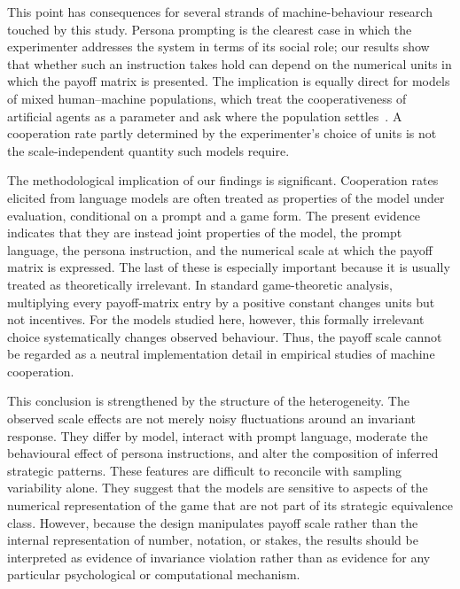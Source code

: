 \documentclass[11pt,a4paper]{article}
\begin{document}
This point has consequences for several strands of machine-behaviour research touched by this study. Persona prompting is the clearest case in which the experimenter addresses the system in terms of its social role; our results show that whether such an instruction takes hold can depend on the numerical units in which the payoff matrix is presented. The implication is equally direct for models of mixed human--machine populations, which treat the cooperativeness of artificial agents as a parameter and ask where the population settles~\cite{santos2018social,han2013good,perc2017statistical,paiva2018engineering}. A cooperation rate partly determined by the experimenter's choice of units is not the scale-independent quantity such models require.


The methodological implication of our findings is significant. Cooperation rates elicited from language models are often treated as properties of the model under evaluation, conditional on a prompt and a game form. The present evidence indicates that they are instead joint properties of the model, the prompt language, the persona instruction, and the numerical scale at which the payoff matrix is expressed. The last of these is especially important because it is usually treated as theoretically irrelevant. 
In standard game-theoretic analysis, multiplying every payoff-matrix entry by a positive constant changes units but not incentives. 
For the models studied here, however, this formally irrelevant choice systematically changes observed behaviour. Thus, the payoff scale cannot be regarded as a neutral implementation detail in empirical studies of machine cooperation.

This conclusion is strengthened by the structure of the heterogeneity. The observed scale effects are not merely noisy fluctuations around an invariant response. They differ by model, interact with prompt language, moderate the behavioural effect of persona instructions, and alter the composition of inferred strategic patterns. These features are difficult to reconcile with sampling variability alone. They suggest that the models are sensitive to aspects of the numerical representation of the game that are not part of its strategic equivalence class. However, because the design manipulates payoff scale rather than the internal representation of number, notation, or stakes, the results should be interpreted as evidence of invariance violation rather than as evidence for any particular psychological or computational mechanism.
\end{document}
